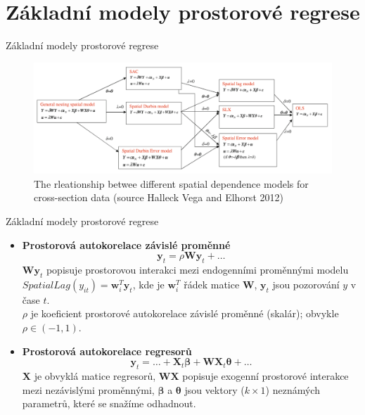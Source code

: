 \documentclass{beamer}
\begin{document}
\section{Základní modely prostorové regrese}
\begin{frame}{Základní modely prostorové regrese}
\begin{figure}
	\includegraphics[width=.9\textwidth]{IMG/sp_reg.PNG}
	\caption{The rleationship betwee different spatial dependence models for cross-section data (source Halleck Vega and Elhorst 2012)}
\end{figure}
\end{frame}
\begin{frame}{Základní modely prostorové regrese}
\begin{itemize}
	\item \textbf{Prostorová autokorelace závislé proměnné}
	$$\bm{y}_t = \rho \bm{W}\bm{y}_t + \dots$$
	$\bm{Wy}_t$ popisuje prostorovou interakci mezi endogenními proměnnými modelu
	$\textit{SpatialLag}(y_{it}) = \bm{w}^T_i \bm{y}_t$, kde je $ \bm{w}^T_i$ řádek matice $\bm{W}$, $\bm{y}_t$ jsou pozorování $y$ v čase $t$.\\
	$\rho$ je koeficient prostorové autokorelace závislé proměnné (skalár); obvykle $\rho \in (-1,1)$.
	\item \textbf{Prostorová autokorelace regresorů}
	$$\bm{y}_t = \dots + \bm{X}_t \bm{\beta} + \bm{W}\bm{X}_t \bm{\theta} + \dots$$
	$\bm{X}$ je obvyklá matice regresorů, $\bm{WX}$ popisuje exogenní prostorové interakce mezi nezávislými proměnnými, $\bm{\beta}$ a $\bm{\theta}$ jsou vektory ($k\times 1$) neznámých parametrů, které se snažíme odhadnout.
\end{itemize}
\end{frame}
\end{document}

